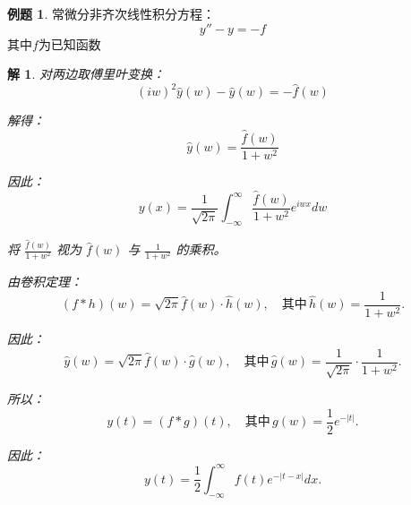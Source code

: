 \documentclass[12pt,a4paper]{article}
\numberwithin{subsection}{section}   %
\numberwithin{subsubsection}{subsection}
\theoremstyle{plain}
\newtheorem{solution}{解}[section]  %
\theoremstyle{definition}
\newtheorem{example}{例题}[section]  %
\theoremstyle{remark}
\theoremstyle{remark}
\begin{document}
\begin{example}
	常微分非齐次线性积分方程：
	\begin{equation}
		y'' - y = -f
	\end{equation}
 其中$  f$为已知函数
	 
	\begin{solution}
		对两边取傅里叶变换：
		\begin{equation}
			(iw)^2 \hat{y}(w) - \hat{y}(w) = -\hat{f}(w)
		\end{equation}
		
		解得：
		\begin{equation}
			\hat{y}(w) = \frac{\hat{f}(w)}{1 + w^2}
		\end{equation}
		
		因此：
		\begin{equation}
			y(x) = \frac{1}{\sqrt{2\pi}} \int_{-\infty}^{\infty} \frac{\hat{f}(w)}{1 + w^2} e^{iwx} dw
		\end{equation}
		
		将 \(\frac{\hat{f}(w)}{1 + w^2}\) 视为 \(\hat{f}(w)\) 与 \(\frac{1}{1 + w^2}\) 的乘积。
		
		由卷积定理：
		\begin{equation}
			(f * h)(w) = \sqrt{2\pi} \hat{f}(w) \cdot \hat{h}(w), \quad \text{其中} \, \hat{h}(w) = \frac{1}{1 + w^2}.
		\end{equation}
		
		因此：
		\begin{equation}
			\hat{y}(w) = \sqrt{2\pi} \hat{f}(w) \cdot \hat{g}(w), \quad \text{其中} \, \hat{g}(w) = \frac{1}{\sqrt{2\pi}} \cdot \frac{1}{1 + w^2}.
		\end{equation}
		
		所以：
		\begin{equation}
			y(t) = (f * g)(t), \quad \text{其中} \, g(w) = \frac{1}{2} e^{-|t|}.
		\end{equation}
		
		因此：
		\begin{equation}
			y(t) = \frac{1}{2} \int_{-\infty}^{\infty} f(t) e^{-|t - x|} dx.
		\end{equation}
		
	\end{solution}
\end{example}
\end{document}
